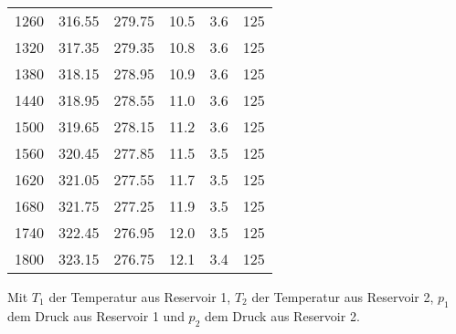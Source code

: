\begin{table}
\begin{tabular}{S[table-format=3.0] S[table-format=1.1] S[table-format=1.1] S[table-format=1.2] S[table-format=1.2] S[table-format=3.0]}
       1260 & 316.55 & 279.75 & 10.5 & 3.6 & 125 \\
       1320 & 317.35 & 279.35 & 10.8 & 3.6 & 125 \\
       1380 & 318.15 & 278.95 & 10.9 & 3.6 & 125 \\
       1440 & 318.95 & 278.55 & 11.0 & 3.6 & 125 \\
       1500 & 319.65 & 278.15 & 11.2 & 3.6 & 125 \\
       1560 & 320.45 & 277.85 & 11.5 & 3.5 & 125 \\
       1620 & 321.05 & 277.55 & 11.7 & 3.5 & 125 \\
       1680 & 321.75 & 277.25 & 11.9 & 3.5 & 125 \\
       1740 & 322.45 & 276.95 & 12.0 & 3.5 & 125 \\
       1800 & 323.15 & 276.75 & 12.1 & 3.4 & 125 \\
      \bottomrule
  \end{tabular}
\end{table}
Mit $T_1$ der Temperatur aus Reservoir 1, $T_2$ der Temperatur aus Reservoir 2, $p_1$ dem Druck aus Reservoir 1 und $p_2$ dem Druck aus Reservoir 2.

